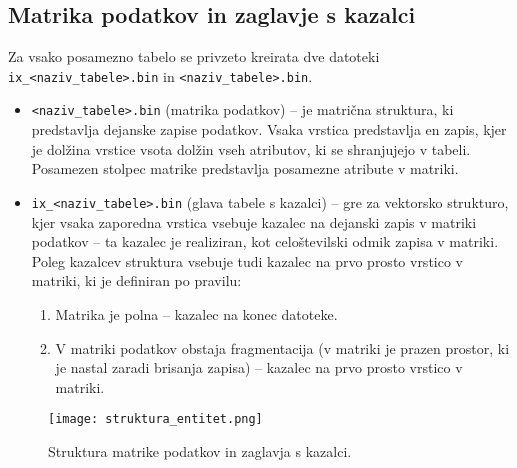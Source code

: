 \documentclass[a4paper,12pt,openright]{book}
\begin{document}
        \subsection{Matrika podatkov in zaglavje s kazalci}
        Za vsako posamezno tabelo se privzeto kreirata dve datoteki {\tt ix\_<naziv\_tabele>.bin} in {\tt <naziv\_tabele>.bin}.
        \begin{itemize}
            \item {\tt <naziv\_tabele>.bin} (matrika podatkov) – je matrična struktura, ki predstavlja dejanske zapise podatkov. Vsaka vrstica predstavlja en zapis, kjer je dolžina vrstice vsota dolžin vseh atributov, ki se shranjujejo v tabeli. Posamezen stolpec matrike predstavlja posamezne atribute v matriki.
            \item {\tt ix\_<naziv\_tabele>.bin} (glava tabele s kazalci) – gre za vektorsko strukturo, kjer vsaka zaporedna vrstica vsebuje kazalec na dejanski zapis v matriki podatkov – ta kazalec je realiziran, kot celoštevilski odmik zapisa v matriki. Poleg kazalcev struktura vsebuje tudi kazalec na prvo prosto vrstico v matriki, ki je definiran po pravilu:
            \begin{enumerate}
                \item Matrika je polna – kazalec na konec datoteke.
                \item V matriki podatkov obstaja fragmentacija (v matriki je prazen prostor, ki je nastal zaradi brisanja zapisa) – kazalec na prvo prosto vrstico v matriki.
            \end{enumerate}
        \end{itemize}

        \begin{figure}[h]
                \centerline{\texttt{[image: struktura\_entitet.png]}}
                \caption{Struktura matrike podatkov in zaglavja s kazalci.}
                \label{sl:matrix_and_header}
            \end{figure}
        
\end{document}
